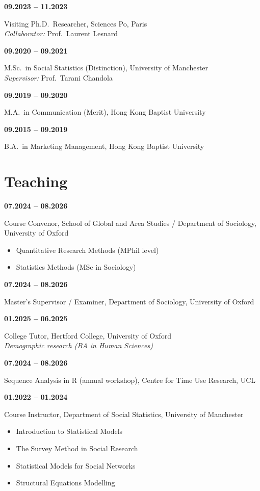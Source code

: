 \documentclass[11pt,a4paper]{article}
\newcommand{\cventry}[2]{%
  \noindent
  \begin{minipage}[t]{0.22\textwidth}\raggedright\textbf{#1}\end{minipage}%
  \hspace{0.015\textwidth}%
  \begin{minipage}[t]{0.755\textwidth}#2\end{minipage}%
  \par\vspace{4pt}%
}
\begin{document}
\cventry{09.2023 -- 11.2023}{Visiting Ph.D.\ Researcher, Sciences Po, Paris\\
  \textit{Collaborator:} Prof.\ Laurent Lesnard}

\cventry{09.2020 -- 09.2021}{M.Sc.\ in Social Statistics (Distinction), University of Manchester\\
  \textit{Supervisor:} Prof.\ Tarani Chandola}

\cventry{09.2019 -- 09.2020}{M.A.\ in Communication (Merit), Hong Kong Baptist University}

\cventry{09.2015 -- 09.2019}{B.A.\ in Marketing Management, Hong Kong Baptist University}

\section*{Teaching}
\cventry{07.2024 -- 08.2026}{Course Convenor, School of Global and Area Studies / Department of Sociology, University of Oxford
  \begin{itemize}
    \item Quantitative Research Methods (MPhil level)
    \item Statistics Methods (MSc in Sociology)
  \end{itemize}}

\cventry{07.2024 -- 08.2026}{Master's Supervisor / Examiner, Department of Sociology, University of Oxford}

\cventry{01.2025 -- 06.2025}{College Tutor, Hertford College, University of Oxford\\
  \textit{Demographic research (BA in Human Sciences)}}

\cventry{07.2024 -- 08.2026}{Sequence Analysis in R (annual workshop), Centre for Time Use Research, UCL}

\cventry{01.2022 -- 01.2024}{Course Instructor, Department of Social Statistics, University of Manchester
  \begin{itemize}
    \item Introduction to Statistical Models
    \item The Survey Method in Social Research
    \item Statistical Models for Social Networks
    \item Structural Equations Modelling
  \end{itemize}}

\end{document}

